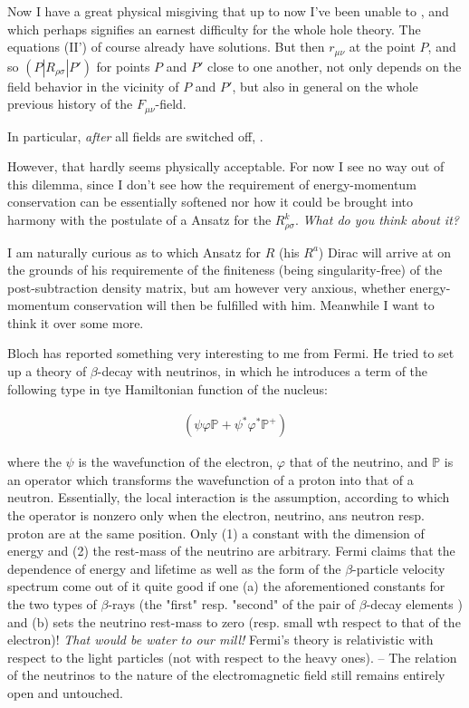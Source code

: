 \documentclass{article}
\newcommand{\uequ}[1]{
\begin{align*}
#1
\end{align*}
}
\begin{document}
Now I have a great physical misgiving that up to now I've been unable to , and which perhaps signifies an earnest difficulty for the whole hole theory. The equations (II') of course already have solutions. But then $r_{\mu\nu}$ at the point $P$, and so $(P|R_{\rho\sigma}|P')$ for points $P$ and $P'$ close to one another, not only depends on the field behavior in the vicinity of $P$ and $P'$, but also in general on the whole previous history of the $F_{\mu\nu}$-field.

In particular, \textit{after} all fields are switched off, .

However, that hardly seems physically acceptable. For now I see no way out of this dilemma, since I don't see how the requirement of energy-momentum conservation can be essentially softened nor how it could be brought into harmony with the postulate of a  Ansatz for the $R^k_{\rho\sigma}$. \textit{What do you think about it?}

I am naturally curious as to which Ansatz for $R$ (his $R^a$) Dirac will arrive at on the grounds of his requiremente of the finiteness (being singularity-free) of the post-subtraction density matrix, but am however very anxious, whether energy-momentum conservation will then be fulfilled with him. Meanwhile I want to think it over some more.

Bloch has reported something very interesting to me from Fermi. He tried to set up a theory of $\beta$-decay with neutrinos, in which he introduces a term of the following type in tye Hamiltonian function of the nucleus:
\uequ{
(\psi\varphi\mathbb{P} + \psi^* \varphi^* \mathbb{P}^{+})
}
where the $\psi$ is the wavefunction of the electron, $\varphi$ that of the neutrino, and $\mathbb{P}$ is an operator which transforms the wavefunction of a proton into that of a neutron. Essentially, the local interaction is the assumption, according to which the operator is nonzero only when the electron, neutrino, ans neutron resp. proton are at the same position. Only (1) a constant with the dimension of energy and (2) the rest-mass of the neutrino are arbitrary. Fermi claims that the dependence of energy and lifetime as well as the form of the $\beta$-particle velocity spectrum come out of it quite good if one (a)  the aforementioned constants for the two types of $\beta$-rays (the "first" resp. "second" of the pair of $\beta$-decay elements ) and (b) sets the neutrino rest-mass to zero (resp. small wth respect to that of the electron)! \textit{That would be water to our mill!} Fermi's theory is relativistic with respect to the light particles (not with respect to the heavy ones). -- The relation of the neutrinos to the nature of the electromagnetic field still remains entirely open and untouched.
\end{document}
